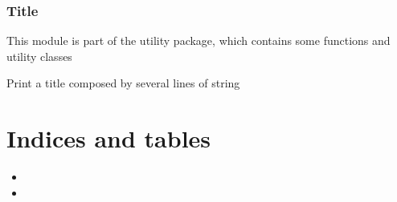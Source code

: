 \documentclass[letterpaper,10pt,english]{sphinxmanual}
\begin{document}
\subsection{Title}
\label{\detokenize{api_reference/utility/title:module-title}}\label{\detokenize{api_reference/utility/title:title}}\label{\detokenize{api_reference/utility/title::doc}}
\sphinxAtStartPar
This module is part of the utility package, which contains some functions and utility classes

\begin{fulllineitems}
\label{\detokenize{api_reference/utility/title:title.print_title}}
\pysigstartsignatures
{}
\pysigstopsignatures
\sphinxAtStartPar
Print a title composed by several lines of string

\end{fulllineitems}



\chapter{Indices and tables}
\label{\detokenize{index:indices-and-tables}}\begin{itemize}
\item {} 
\sphinxAtStartPar
{}

\item {} 
\sphinxAtStartPar
{}

\end{itemize}
\end{document}

